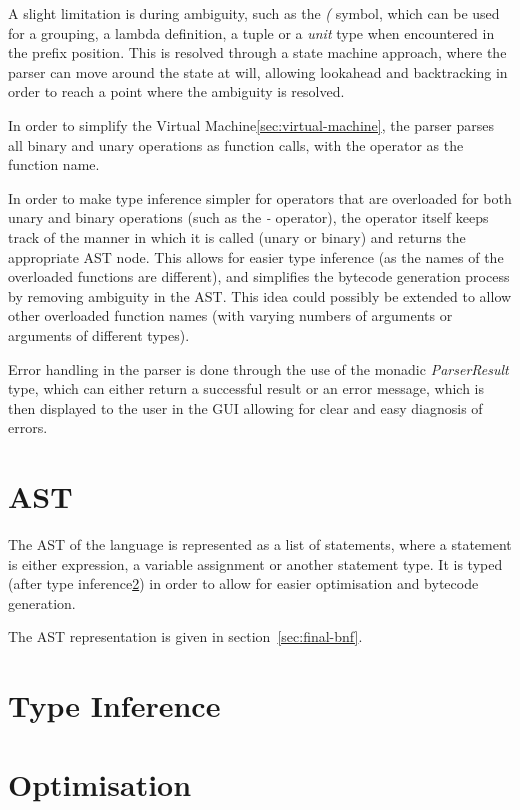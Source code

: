 A slight limitation is during ambiguity, such as the \textit{(} symbol, which can be used for a grouping, a lambda 
definition, a tuple or a \textit{unit} type when encountered in the prefix position.
This is resolved through a state machine approach, where the parser can move around the state at will, allowing 
lookahead and backtracking in order to reach a point where the ambiguity is resolved.

In order to simplify the Virtual Machine\ref{sec:virtual-machine}, the parser parses all binary and unary operations 
as function calls, with the operator as the function name.

In order to make type inference simpler for operators that are overloaded for both unary and binary operations (such 
as the \textit{-} operator), the operator itself keeps track of the manner in which it is called (unary or binary) and
returns the appropriate AST node. 
This allows for easier type inference (as the names of the overloaded functions are different), 
and simplifies the bytecode generation process by removing ambiguity in the AST\@.
This idea could possibly be extended to allow other overloaded function names (with varying numbers of arguments or 
arguments of different types).

Error handling in the parser is done through the use of the monadic \textit{ParserResult} type, which can either 
return a successful result or an error message, which is then displayed to the user in the GUI allowing for clear 
and easy diagnosis of errors.

\section{AST}\label{sec:expression}

The AST of the language is represented as a list of statements, where a statement is either expression, a
variable assignment or another statement type.
It is typed (after type inference\ref{sec:type-inference}) in order to allow for easier optimisation and
bytecode generation.

The AST representation is given in section~\ref{sec:final-bnf}.

\section{Type Inference}\label{sec:type-inference}


\section{Optimisation}\label{sec:optimisation}

